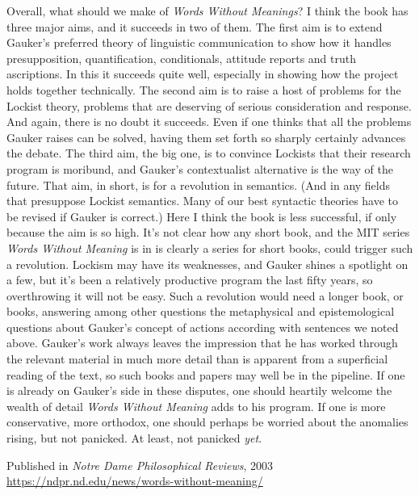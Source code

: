 \documentclass[
  11pt,
  letterpaper,
  DIV=11,
  numbers=noendperiod,
  twoside]{scrartcl}
\begin{document}
Overall, what should we make of \emph{Words Without Meanings}? I think
the book has three major aims, and it succeeds in two of them. The first
aim is to extend Gauker's preferred theory of linguistic communication
to show how it handles presupposition, quantification, conditionals,
attitude reports and truth ascriptions. In this it succeeds quite well,
especially in showing how the project holds together technically. The
second aim is to raise a host of problems for the Lockist theory,
problems that are deserving of serious consideration and response. And
again, there is no doubt it succeeds. Even if one thinks that all the
problems Gauker raises can be solved, having them set forth so sharply
certainly advances the debate. The third aim, the big one, is to
convince Lockists that their research program is moribund, and Gauker's
contextualist alternative is the way of the future. That aim, in short,
is for a revolution in semantics. (And in any fields that presuppose
Lockist semantics. Many of our best syntactic theories have to be
revised if Gauker is correct.) Here I think the book is less successful,
if only because the aim is so high. It's not clear how any short book,
and the MIT series \emph{Words Without Meaning} is in is clearly a
series for short books, could trigger such a revolution. Lockism may
have its weaknesses, and Gauker shines a spotlight on a few, but it's
been a relatively productive program the last fifty years, so
overthrowing it will not be easy. Such a revolution would need a longer
book, or books, answering among other questions the metaphysical and
epistemological questions about Gauker's concept of actions according
with sentences we noted above. Gauker's work always leaves the
impression that he has worked through the relevant material in much more
detail than is apparent from a superficial reading of the text, so such
books and papers may well be in the pipeline. If one is already on
Gauker's side in these disputes, one should heartily welcome the wealth
of detail \emph{Words Without Meaning} adds to his program. If one is
more conservative, more orthodox, one should perhaps be worried about
the anomalies rising, but not panicked. At least, not panicked
\emph{yet}.



\noindent Published in \emph{Notre Dame Philosophical Reviews}, 2003 \\
\url{https://ndpr.nd.edu/news/words-without-meaning/}
\end{document}
